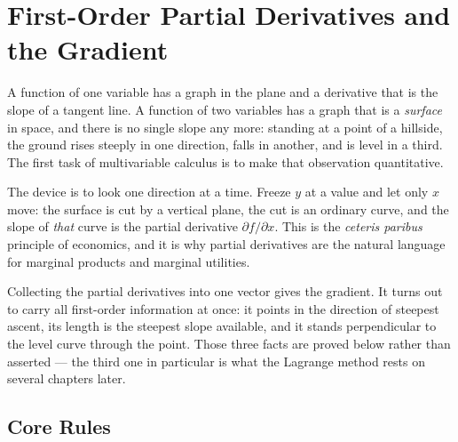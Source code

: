 \chapter{First-Order Partial Derivatives and the Gradient}

A function of one variable has a graph in the plane and a derivative that is
the slope of a tangent line. A function of two variables has a graph that is
a \emph{surface} in space, and there is no single slope any more: standing
at a point of a hillside, the ground rises steeply in one direction, falls
in another, and is level in a third. The first task of multivariable
calculus is to make that observation quantitative.

The device is to look one direction at a time. Freeze $y$ at a value and let
only $x$ move: the surface is cut by a vertical plane, the cut is an
ordinary curve, and the slope of \emph{that} curve is the partial derivative
$\partial f/\partial x$. This is the \emph{ceteris paribus} principle of
economics, and it is why partial derivatives are the natural language for
marginal products and marginal utilities.

Collecting the partial derivatives into one vector gives the gradient. It
turns out to carry all first-order information at once: it points in the
direction of steepest ascent, its length is the steepest slope available,
and it stands perpendicular to the level curve through the point. Those
three facts are proved below rather than asserted --- the third one in
particular is what the Lagrange method rests on several chapters later.

\section{Core Rules}

